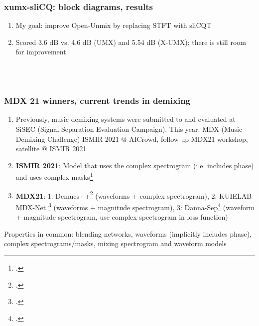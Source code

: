 \documentclass[usenames,dvipsnames]{beamer}
\begin{document}
\begin{frame}
	\frametitle{xumx-sliCQ: block diagrams, results}
	\begin{enumerate}
		\item
			My goal: improve Open-Unmix by replacing STFT with sliCQT
		\item
			Scored 3.6 dB vs. 4.6 dB (UMX) and 5.54 dB (X-UMX); there is still room for improvement
	\end{enumerate}
	\begin{figure}[ht]
		\centering
		\vspace{-1.15em}
		\\
		\vspace{-0.5em}
		\\
		\vspace{-0.5em}
	\end{figure}
\end{frame}

\begin{frame}
	\frametitle{MDX 21 winners, current trends in demixing}
	\begin{enumerate}
		\item
			Previously, music demixing systems were submitted to and evaluated at SiSEC (Signal Separation Evaluation Campaign). This year: MDX (Music Demixing Challenge) ISMIR 2021 @ AICrowd, follow-up MDX21 workshop, satellite @ ISMIR 2021
		\item
			\textbf{ISMIR 2021}: Model that uses the complex spectrogram (i.e. includes phase) and uses complex masks\footcite{kong2021decoupling}
		\item
			\textbf{MDX21}: 1: Demucs++\footcite{demucsplus} (waveforms + complex spectrogram), 2: KUIELAB-MDX-Net \footcite{choi2021} (waveforms + magnitude spectrogram), 3: Danna-Sep\footcite{dannasep} (waveform + magnitude spectrogram, use complex spectrogram in loss function)
	\end{enumerate}
	Properties in common: blending networks, waveforms (implicitly includes phase), complex spectrograms/masks, mixing spectrogram and waveform models
\end{frame}
\end{document}
